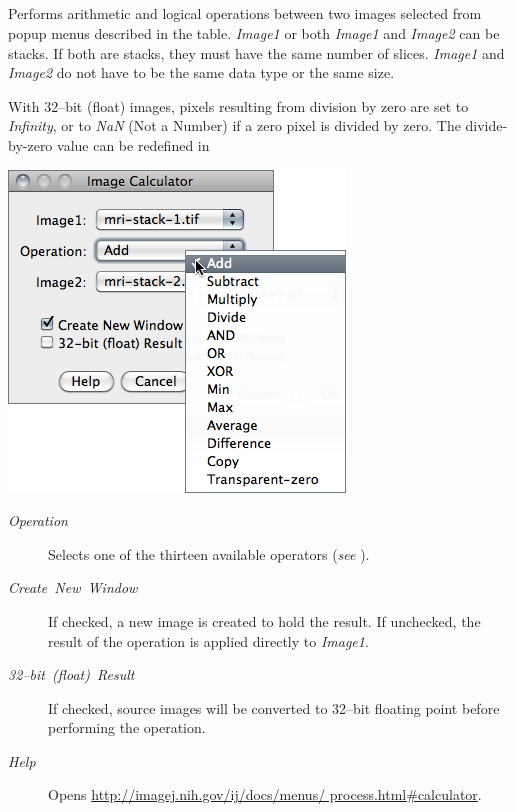 \subsection{\protect{}\label{sub:Image-Calculator...}}

Performs arithmetic and logical operations between two images selected
from popup menus described in the  table.
\emph{Image1} or both \emph{Image1} and \emph{Image2} can be stacks.
If both are stacks, they must have the same number of slices. \emph{Image1}
and \emph{Image2} do not have to be the same data type or the same
size.

With 32--bit (float) images, pixels resulting from division by zero
are set to \emph{Infinity}, or to \emph{NaN} (Not a Number) if a zero
pixel is divided by zero. The divide-by-zero value can be redefined
in 

\begin{minipage}[c][1\totalheight][t]{0.47\columnwidth}%
\includegraphics[scale=0.55]{images/ImageCalculator}%
\end{minipage}%
\begin{minipage}[c][1\totalheight][t]{0.53\columnwidth}%
\begin{description}
\item [{\emph{Operation}}] Selects one of the thirteen available operators
(\emph{see} ).
\item [{\emph{Create\ New\ Window}}] If checked, a new image is created
to hold the result. If unchecked, the result of the operation is applied
directly to \emph{Image1}.
\item [{\emph{32--bit\ (float)\ Result}}] If checked, source images will
be converted to 32--bit floating point before performing the operation.
\item [{\emph{Help}}] Opens \href{http://imagej.nih.gov/ij/docs/menus/process.html\#calculator}{http://imagej.nih.gov/ij/docs/menus/ process.html\#{}calculator}.\end{description}
%
\end{minipage}

